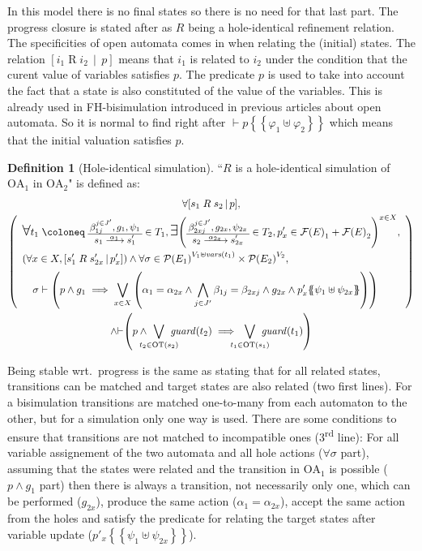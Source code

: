 \documentclass{article}
\theoremstyle{plain}
\theoremstyle{definition}
\newtheorem{defi}{Definition}
\newcommand\nmm[1]{\(\displaystyle #1\)}
\newcommand\mpar[1]{{\left(#1\right)}}
\newcommand\mbrk[1]{{\left[#1\right]}}
\newcommand\mbrc[1]{{\left\{#1\right\}}}
\newcommand\psubst[1]{\mbrc{\!\!\mbrc{#1}\!\!}}
\newcommand\midbar{\,\middle|\,}
\newcommand\prel[4]{\mbrk{#2\mathrel{#1}#3\midbar #4}}
\newcommand\subbox[1]{{\makebox[.5\width]{\(\scriptstyle #1\)}}}
\newcommand\bigsymb[2][\Large]{\text{#1\nmm{#2}}}
\newcommand\defobject{\DOTSB\;{\coloneq}\;}
\newcommand\sat{{\vdash}}
\newcommand\fvars[1]{{\mathit{vars}\mpar{#1}}}
\newcommand\fformulas[1]{{\mathcal{F}\mpar{#1}}}
\newcommand\fvalues[1]{{\mathcal{P}\mpar{#1}}}
\newcommand\OT[6]{\text{\small\(%
	\setlength\arraycolsep{2pt}\everymath{\displaystyle}%
	\begin{array}{c}%
	#4,#5,#6 \\\hline
	#1\xrightarrow{\raisebox{-1.5pt}[.8\height][0pt]{\makebox[1.4\width]{\(\scriptstyle #3\)}}}#2
	\end{array}\)}}
\newcommand\OTx[4]{\OT{s_{#1}}{s'_{#1 #2}}{\alpha_{#1 #2}}{\beta_{#3 j}^{j \in J'_{#4}}}{g_{#1 #2}}{\psi_{#1 #2}}}
\begin{document}
In this model there is no final states so there is no need for that last part.
The progress closure is stated after as \(R\) being a hole-identical refinement relation.
The specificities of open automata comes in when relating the (initial) states.
The relation \(\prel{R}{i_1}{i_2}{p}\) means that \(i_1\) is related to \(i_2\) under the condition that the curent value of variables satisfies \(p\).
The predicate \(p\) is used to take into account the fact that a state is also constituted of the value of the variables.
This is already used in FH-bisimulation introduced in previous articles about open automata.
So it is normal to find right after \(\vdash p\psubst{\varphi_1 \uplus \varphi_2}\) which means that the initial valuation satisfies \(p\).
\begin{defi}[Hole-identical simulation]
``\(R\) is a hole-identical simulation of \(\mathrm{OA}_1\) in \(\mathrm{OA}_2\)" is defined as:
\begin{multline*}
	\forall \prel{R}{s_1}{s_2}{p}, \\
	\mpar{\everymath{\displaystyle}\begin{array}{l}
		\bigsymb{\forall} t_1 \defobject \OTx{1}{}{1}{} \in T_1, \bigsymb{\exists} \mpar{\OTx{2}{x}{2x}{} \in T_2, p'_x \in \fformulas{E}_1 + \fformulas{E}_2}^{x \in X}, \\[12pt]
		\mpar{\forall x \in X, \prel{R}{s'_1}{s'_{2x}}{p'_x}} \wedge \forall \sigma \in \fvalues{E_1}^{V_1 \uplus \fvars{t_1}} \times \fvalues{E_2}^{V_2}, \\[6pt]
		\quad \sigma \vdash \mpar{p \wedge g_1 \implies \bigvee_{x \in X} \mpar{\alpha_1 = \alpha_{2x} \wedge \bigwedge_{j \in J'} \beta_{1j} = \beta_{2xj} \wedge g_{2x} \wedge p'_x\psubst{\psi_1 \uplus \psi_{2x}}}} \\[12pt]
	\end{array}} \\
	\wedge \sat\mpar{p \wedge \bigvee_\subbox{t_2 \in \mathrm{OT}\mpar{s_2}} \mathit{guard}\mpar{t_2} \implies \bigvee_\subbox{t_1 \in \mathrm{OT}\mpar{s_1}} \mathit{guard}\mpar{t_1}}
\end{multline*}
\end{defi}
Being stable wrt.\ progress is the same as stating that for all related states, transitions can be matched and target states are also related (two first lines).
For a bisimulation transitions are matched one-to-many from each automaton to the other, but for a simulation only one way is used.
There are some conditions to ensure that transitions are not matched to incompatible ones (3\textsuperscript{rd} line):
For all variable assignement of the two automata and all hole actions (\(\forall \sigma\) part), assuming that the states were related and the transition in \(\mathrm{OA}_1\) is possible (\(p \wedge g_1\) part) then there is always a transition, not necessarily only one, which can be performed (\(g_{2x}\)), produce the same action (\(\alpha_1 = \alpha_{2x}\)), accept the same action from the holes and satisfy the predicate for relating the target states after variable update (\(p'_x\psubst{\psi_1 \uplus \psi_{2x}}\)).
\end{document}
